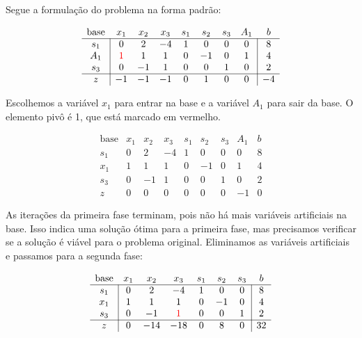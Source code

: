 \documentclass{article}
\begin{document}
Segue a formulação do problema na forma padrão:

\[
  \begin{array}{c|ccccccc|c}
    \text{base} &                       x_1 & x_2 & x_3 & s_1 & s_2 & s_3 & A_1 &  b \\ \hline
            s_1 &                         0 &   2 &  -4 &   1 &   0 &   0 &   0 &  8 \\
            A_1 & \color{red}1\color{black} &   1 &   1 &   0 &  -1 &   0 &   1 &  4 \\
            s_3 &                         0 &  -1 &   1 &   0 &   0 &   1 &   0 &  2 \\ \hline
              z &                        -1 &  -1 &  -1 &   0 &   1 &   0 &   0 & -4
  \end{array}
\]

Escolhemos a variável $x_1$ para entrar na base e a variável $A_1$ para sair da base.
O elemento pivô é 1, que está marcado em vermelho.

\[
  \begin{array}{c|ccccccc|c}
    \text{base} & x_1 & x_2 & x_3 & s_1 & s_2 & s_3 & A_1 &  b \\ \hline
            s_1 &   0 &   2 &  -4 &   1 &   0 &   0 &   0 &  8 \\
            x_1 &   1 &   1 &   1 &   0 &  -1 &   0 &   1 &  4 \\
            s_3 &   0 &  -1 &   1 &   0 &   0 &   1 &   0 &  2 \\ \hline
              z &   0 &   0 &   0 &   0 &   0 &   0 &  -1 &  0
  \end{array}
\]

As iterações da primeira fase terminam, pois não há mais variáveis artificiais na base.
Isso indica uma solução ótima para a primeira fase, mas precisamos verificar se a solução é viável para o problema original.
Eliminamos as variáveis artificiais e passamos para a segunda fase:

\[
  \begin{array}{c|cccccc|c}
    \text{base} & x_1 & x_2 &                         x_3 & s_1 & s_2 & s_3 &  b \\ \hline
            s_1 &   0 &   2 &                          -4 &   1 &   0 &   0 &  8 \\
            x_1 &   1 &   1 &                           1 &   0 &  -1 &   0 &  4 \\
            s_3 &   0 &  -1 & \color{red} 1 \color{black} &   0 &   0 &   1 &  2 \\ \hline
              z &   0 & -14 &                         -18 &   0 &   8 &   0 & 32
  \end{array}
\]
\end{document}
